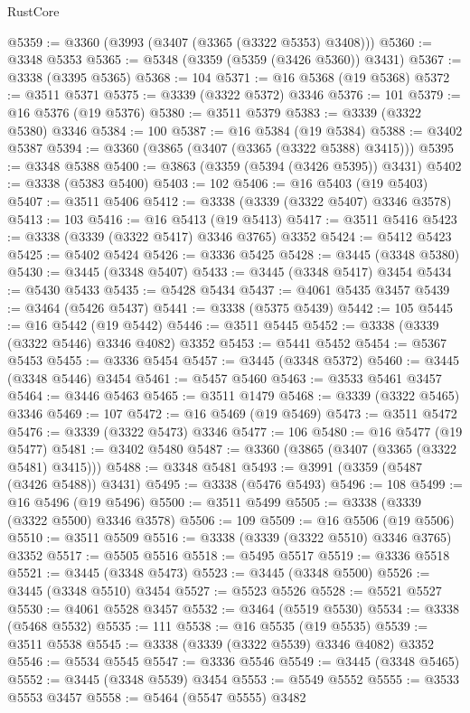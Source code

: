 \begin{lexlean}{RustCore}
\begin{coremodule}
@5359 := @3360 (@3993 (@3407 (@3365 (@3322 @5353) @3408)))
@5360 := @3348 @5353
@5365 := @5348 (@3359 (@5359 (@3426 @5360)) @3431)
@5367 := @3338 (@3395 @5365)
@5368 := 104
@5371 := @16 @5368 (@19 @5368)
@5372 := @3511 @5371
@5375 := @3339 (@3322 @5372) @3346
@5376 := 101
@5379 := @16 @5376 (@19 @5376)
@5380 := @3511 @5379
@5383 := @3339 (@3322 @5380) @3346
@5384 := 100
@5387 := @16 @5384 (@19 @5384)
@5388 := @3402 @5387
@5394 := @3360 (@3865 (@3407 (@3365 (@3322 @5388) @3415)))
@5395 := @3348 @5388
@5400 := @3863 (@3359 (@5394 (@3426 @5395)) @3431)
@5402 := @3338 (@5383 @5400)
@5403 := 102
@5406 := @16 @5403 (@19 @5403)
@5407 := @3511 @5406
@5412 := @3338 (@3339 (@3322 @5407) @3346 @3578)
@5413 := 103
@5416 := @16 @5413 (@19 @5413)
@5417 := @3511 @5416
@5423 := @3338 (@3339 (@3322 @5417) @3346 @3765) @3352
@5424 := @5412 @5423
@5425 := @5402 @5424
@5426 := @3336 @5425
@5428 := @3445 (@3348 @5380)
@5430 := @3445 (@3348 @5407)
@5433 := @3445 (@3348 @5417) @3454
@5434 := @5430 @5433
@5435 := @5428 @5434
@5437 := @4061 @5435 @3457
@5439 := @3464 (@5426 @5437)
@5441 := @3338 (@5375 @5439)
@5442 := 105
@5445 := @16 @5442 (@19 @5442)
@5446 := @3511 @5445
@5452 := @3338 (@3339 (@3322 @5446) @3346 @4082) @3352
@5453 := @5441 @5452
@5454 := @5367 @5453
@5455 := @3336 @5454
@5457 := @3445 (@3348 @5372)
@5460 := @3445 (@3348 @5446) @3454
@5461 := @5457 @5460
@5463 := @3533 @5461 @3457
@5464 := @3446 @5463
@5465 := @3511 @1479
@5468 := @3339 (@3322 @5465) @3346
@5469 := 107
@5472 := @16 @5469 (@19 @5469)
@5473 := @3511 @5472
@5476 := @3339 (@3322 @5473) @3346
@5477 := 106
@5480 := @16 @5477 (@19 @5477)
@5481 := @3402 @5480
@5487 := @3360 (@3865 (@3407 (@3365 (@3322 @5481) @3415)))
@5488 := @3348 @5481
@5493 := @3991 (@3359 (@5487 (@3426 @5488)) @3431)
@5495 := @3338 (@5476 @5493)
@5496 := 108
@5499 := @16 @5496 (@19 @5496)
@5500 := @3511 @5499
@5505 := @3338 (@3339 (@3322 @5500) @3346 @3578)
@5506 := 109
@5509 := @16 @5506 (@19 @5506)
@5510 := @3511 @5509
@5516 := @3338 (@3339 (@3322 @5510) @3346 @3765) @3352
@5517 := @5505 @5516
@5518 := @5495 @5517
@5519 := @3336 @5518
@5521 := @3445 (@3348 @5473)
@5523 := @3445 (@3348 @5500)
@5526 := @3445 (@3348 @5510) @3454
@5527 := @5523 @5526
@5528 := @5521 @5527
@5530 := @4061 @5528 @3457
@5532 := @3464 (@5519 @5530)
@5534 := @3338 (@5468 @5532)
@5535 := 111
@5538 := @16 @5535 (@19 @5535)
@5539 := @3511 @5538
@5545 := @3338 (@3339 (@3322 @5539) @3346 @4082) @3352
@5546 := @5534 @5545
@5547 := @3336 @5546
@5549 := @3445 (@3348 @5465)
@5552 := @3445 (@3348 @5539) @3454
@5553 := @5549 @5552
@5555 := @3533 @5553 @3457
@5558 := @5464 (@5547 @5555) @3482

\end{coremodule}
\end{lexlean}
